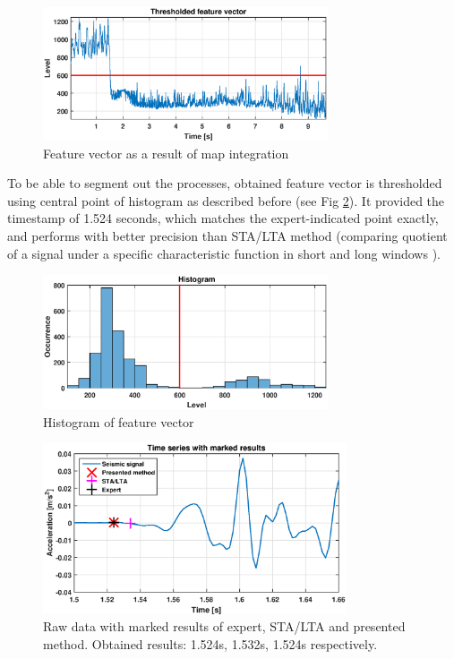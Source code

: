 \documentclass[smallextended]{svjour3}       %
\begin{document}
\begin{figure}[!ht]
\centering
\includegraphics[width = 0.75\textwidth]{figs/duty}
\caption{Feature vector as a result of map integration}
\label{fig: duty}
\end{figure}

To be able to segment out the processes, obtained feature vector is thresholded using central point of histogram as described before (see Fig \ref{fig: hist}). It provided the timestamp of 1.524 seconds, which matches the expert-indicated point exactly, and performs with better precision than STA/LTA method (comparing quotient of a signal under a specific characteristic function in short and long windows \cite{allen1978automatic}). 

\begin{figure}[!ht]
\centering
\includegraphics[width = 0.75\textwidth]{figs/hist}
\caption{Histogram of feature vector}
\label{fig: hist}
\end{figure}



\begin{figure}[!ht]
\centering
\includegraphics[width = 0.8\textwidth]{figs/final}
\caption{Raw data with marked results of expert, STA/LTA and presented method. Obtained results: 1.524s, 1.532s, 1.524s respectively.}
\label{fig: final}
\end{figure}
\end{document}
